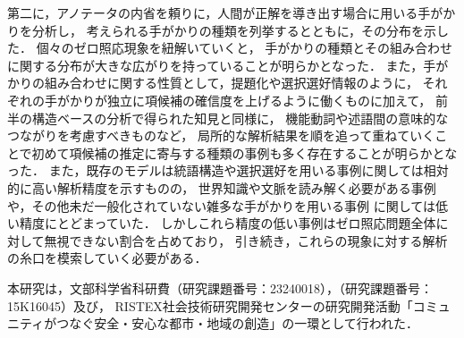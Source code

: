 \documentclass[japanese]{jnlp_1.4}
\begin{document}
第二に，アノテータの内省を頼りに，人間が正解を導き出す場合に用いる手がかりを分析し，
考えられる手がかりの種類を列挙するとともに，その分布を示した．
個々のゼロ照応現象を紐解いていくと，
手がかりの種類とその組み合わせに関する分布が大きな広がりを持っていることが明らかとなった．
また，手がかりの組み合わせに関する性質として，提題化や選択選好情報のように，
それぞれの手がかりが独立に項候補の確信度を上げるように働くものに加えて，
前半の構造ベースの分析で得られた知見と同様に，
機能動詞や述語間の意味的なつながりを考慮すべきものなど，
局所的な解析結果を順を追って重ねていくことで初めて項候補の推定に寄与する種類の事例も多く存在することが明らかとなった．
また，既存のモデルは統語構造や選択選好を用いる事例に関しては相対的に高い解析精度を示すものの，
世界知識や文脈を読み解く必要がある事例や，その他未だ一般化されていない雑多な手がかりを用いる事例
に関しては低い精度にとどまっていた．
しかしこれら精度の低い事例はゼロ照応問題全体に対して無視できない割合を占めており，
引き続き，これらの現象に対する解析の糸口を模索していく必要がある．



\acknowledgment

本研究は，文部科学省科研費（研究課題番号：23240018），（研究課題番号：15K16045）及び，
RISTEX社会技術研究開発センターの研究開発活動「コミュニティがつなぐ安全・安心な都市・地域の創造」の一環として行われた．
\end{document}
